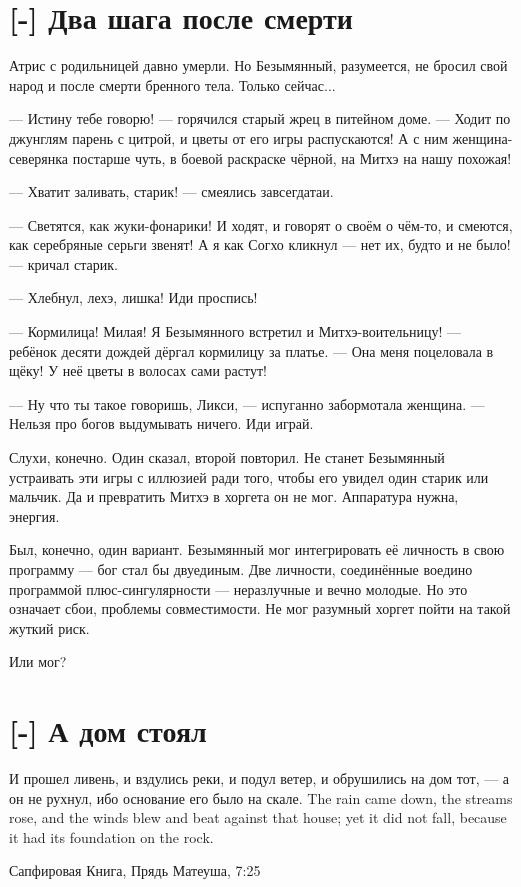 \section{[-] Два шага после смерти}

\textspace

Атрис с родильницей давно умерли.
Но Безымянный, разумеется, не бросил свой народ и после смерти бренного тела.
Только сейчас...

--- Истину тебе говорю! --- горячился старый жрец в питейном доме.
--- Ходит по джунглям парень с цитрой, и цветы от его игры распускаются!
А с ним женщина-северянка постарше чуть, в боевой раскраске чёрной, на Митхэ на нашу похожая!

--- Хватит заливать, старик! --- смеялись завсегдатаи.

--- Светятся, как жуки-фонарики!
И ходят, и говорят о своём о чём-то, и смеются, как серебряные серьги звенят!
А я как Согхо кликнул --- нет их, будто и не было! --- кричал старик.

--- Хлебнул, лехэ, лишка!
Иди проспись!

--- Кормилица!
Милая!
Я Безымянного встретил и Митхэ-воительницу! --- ребёнок десяти дождей дёргал кормилицу за платье.
--- Она меня поцеловала в щёку!
У неё цветы в волосах сами растут!

--- Ну что ты такое говоришь, Ликси, --- испуганно забормотала женщина.
--- Нельзя про богов выдумывать ничего.
Иди играй.

Слухи, конечно.
Один сказал, второй повторил.
Не станет Безымянный устраивать эти игры с иллюзией ради того, чтобы его увидел один старик или мальчик.
Да и превратить Митхэ в хоргета он не мог.
Аппаратура нужна, энергия.

Был, конечно, один вариант.
Безымянный мог интегрировать её личность в свою программу --- бог стал бы двуединым.
Две личности, соединённые воедино программой плюс-сингулярности --- неразлучные и вечно молодые.
Но это означает сбои, проблемы совместимости.
Не мог разумный хоргет пойти на такой жуткий риск.

Или мог?

\section{[-] А дом стоял}

\epigraph{
{И прошел ливень, и вздулись реки, и подул ветер, и обрушились на дом тот, --- а он не рухнул, ибо основание его было на скале.}
{The rain came down, the streams rose, and the winds blew and beat against that house; yet it did not fall, because it had its foundation on the rock.}
}{Сапфировая Книга, Прядь Матеуша, 7:25}

